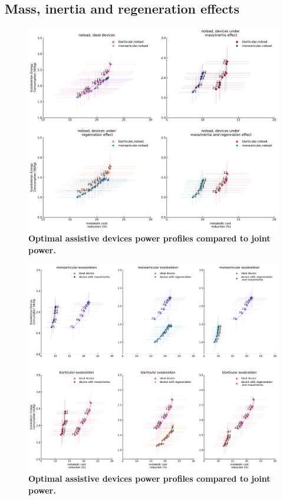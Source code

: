 \documentclass[10pt,letterpaper]{article}
\begin{document}
\subsection*{Mass, inertia and regeneration effects}
\begin{figure}[ht]   
	\centering
	\includegraphics[width=\linewidth]{Pareto_Mass_Regenration_Figures/PaperFigure_AddingMass_Pareto.pdf}
	\vspace{1mm}
	\caption{{\small\textbf{Optimal assistive devices power profiles compared to joint power.} }}
	\label{Fig_Paretofronts_Mass_Regeneration_Effect}
\end{figure}
\begin{figure}[ht]   
	\centering
	\includegraphics[width=\linewidth]{Pareto_Mass_Regenration_Figures/PaperFigure_Pareto_Comparison.pdf}
	\vspace{1mm}
	\caption{{\small\textbf{Optimal assistive devices power profiles compared to joint power.}}}
	\label{Fig_Paretofronts_Mass_Regeneration_Effect_Comparison}
\end{figure}
\end{document}
